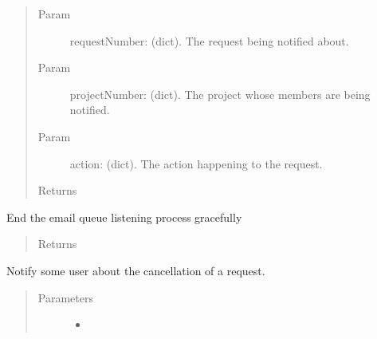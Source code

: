 \documentclass[letterpaper,10pt,english]{sphinxmanual}
\begin{document}
\begin{fulllineitems}
\begin{fulllineitems}
\begin{quote}
\begin{description}
\item[{Param}] \leavevmode
requestNumber: (dict). The request being notified about.

\item[{Param}] \leavevmode
projectNumber: (dict). The project whose members are being notified.

\item[{Param}] \leavevmode
action: (dict). The action happening to the request.

\item[{Returns}] \leavevmode


\end{description}\end{quote}

\end{fulllineitems}


\begin{fulllineitems}
\label{\detokenize{apidoc/utdesign_procurement:utdesign_procurement.emailer.EmailHandler.die}}
End the email queue listening process gracefully
\begin{quote}\begin{description}
\item[{Returns}] \leavevmode


\end{description}\end{quote}

\end{fulllineitems}


\begin{fulllineitems}
\label{\detokenize{apidoc/utdesign_procurement:utdesign_procurement.emailer.EmailHandler.notifyCancelled}}
Notify some user about the cancellation of a request.
\begin{quote}\begin{description}
\item[{Parameters}] \leavevmode\begin{itemize}
\item {} 
 \textendash{} 


\end{itemize}
\end{description}
\end{quote}
\end{fulllineitems}
\end{fulllineitems}
\end{document}
